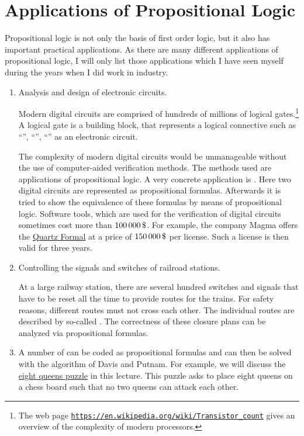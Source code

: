 \section{Applications of Propositional Logic}
Propositional logic is not only the basis of first order logic, but it also has important practical
applications.  As there are many different applications of propositional logic, I will only list those
applications which I have seen myself during the years when I did work in industry.
\begin{enumerate}
\item Analysis and design of electronic circuits.

      Modern digital circuits are comprised of hundreds of millions of logical gates.\footnote{The web page
      \href{https://en.wikipedia.org/wiki/Transistor_count}{\texttt{https://en.wikipedia.org/wiki/Transistor\_count}}
      gives an overview of the complexity of modern processors.}
      A logical gate  is a building block, that represents a logical connective such as ``'',
      ``'', ``'' as an electronic circuit.

      The complexity of modern digital circuits would be unmanageable without
      the use of computer-aided verification methods.  The methods used are applications of propositional logic. 
      A very concrete application is .  Here two
      digital circuits are represented as propositional formulas.
      Afterwards it is tried to show the equivalence of these formulas by means of propositional logic.
      Software tools, which are used for the verification of digital
      circuits sometimes cost more than $100\,000\,\symbol{36}$.
      For example, the company Magma offers the 
      \href{https://www.eetimes.com/document.asp?doc_id=1217672}{Quartz Formal} at a price
      of $150\,000\,
      \symbol{36}$ per license.  Such a license is then valid for three years.


\item Controlling the signals and switches of railroad stations.

      At a large railway station, there are several hundred switches and signals that have to be 
      reset all the time to provide routes for the trains.
      For safety reasons, different routes must not cross each other.  
      The individual routes are described by so-called .
      The correctness of these closure plans can be analyzed via propositional formulas.
\item A number of  can be coded as propositional formulas and can then be solved with the
      algorithm of Davis and Putnam.
      For example, we will discuss the 
      \href{https://en.wikipedia.org/wiki/Eight_queens_puzzle}{eight queens puzzle} in this lecture.
      This puzzle asks to place eight queens on a chess board such that no two queens can attack each other.
\end{enumerate}


